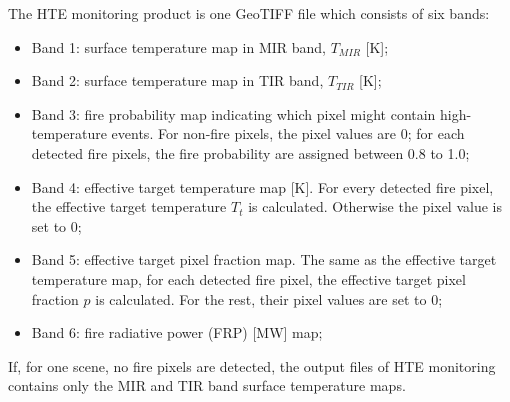 \noindent The HTE monitoring product is one GeoTIFF file which consists of six bands:
\begin{itemize}
\item Band 1: surface temperature map in MIR band, $T_{MIR}$ [K];
\item Band 2: surface temperature map in TIR band, $T_{TIR}$ [K];
\item Band 3: fire probability map indicating which pixel might contain high-temperature events. For non-fire pixels, the pixel values are 0; for each detected fire pixels, the fire probability are assigned between 0.8 to 1.0;
\item Band 4: effective target temperature map [K]. For every detected fire pixel, the effective target temperature $T_t$ is calculated.  Otherwise the pixel value is set to 0;
\item Band 5: effective target pixel fraction map. The same as the effective target temperature map, for each detected fire pixel, the effective target pixel fraction $p$ is calculated. For the rest, their pixel values are set to 0;
\item Band 6: fire radiative power (FRP) [MW] map;
\end{itemize}

\noindent If, for one scene, no fire pixels are detected, the output files of HTE monitoring contains only the MIR and TIR band surface temperature maps.\\